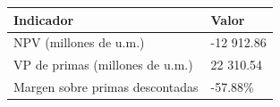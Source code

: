 \begin{tabular}{ll}
\toprule
Indicador & Valor \\
\midrule
NPV (millones de u.m.) & -12 912.86 \\
VP de primas (millones de u.m.) & 22 310.54 \\
Margen sobre primas descontadas & -57.88\% \\
\bottomrule
\end{tabular}

